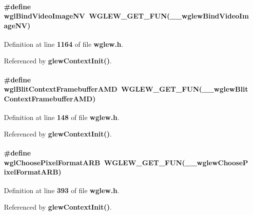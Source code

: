 \paragraph[{wgl\+Bind\+Video\+Image\+NV}]{\setlength{\rightskip}{0pt plus 5cm}\#define wgl\+Bind\+Video\+Image\+NV~{\bf W\+G\+L\+E\+W\+\_\+\+G\+E\+T\+\_\+\+F\+UN}({\bf \+\_\+\+\_\+wglew\+Bind\+Video\+Image\+NV})}\label{wglew_8h_a44f303d6cb4d1ebb1fc2d94b0680caac}


Definition at line {\bf 1164} of file {\bf wglew.\+h}.



Referenced by {\bf glew\+Context\+Init()}.

\paragraph[{wgl\+Blit\+Context\+Framebuffer\+A\+MD}]{\setlength{\rightskip}{0pt plus 5cm}\#define wgl\+Blit\+Context\+Framebuffer\+A\+MD~{\bf W\+G\+L\+E\+W\+\_\+\+G\+E\+T\+\_\+\+F\+UN}({\bf \+\_\+\+\_\+wglew\+Blit\+Context\+Framebuffer\+A\+MD})}\label{wglew_8h_ad212b9799695b7782de0e605a68ee018}


Definition at line {\bf 148} of file {\bf wglew.\+h}.



Referenced by {\bf glew\+Context\+Init()}.

\paragraph[{wgl\+Choose\+Pixel\+Format\+A\+RB}]{\setlength{\rightskip}{0pt plus 5cm}\#define wgl\+Choose\+Pixel\+Format\+A\+RB~{\bf W\+G\+L\+E\+W\+\_\+\+G\+E\+T\+\_\+\+F\+UN}({\bf \+\_\+\+\_\+wglew\+Choose\+Pixel\+Format\+A\+RB})}\label{wglew_8h_ac8759d4f1193da04f4f215446b70eded}


Definition at line {\bf 393} of file {\bf wglew.\+h}.



Referenced by {\bf glew\+Context\+Init()}.

